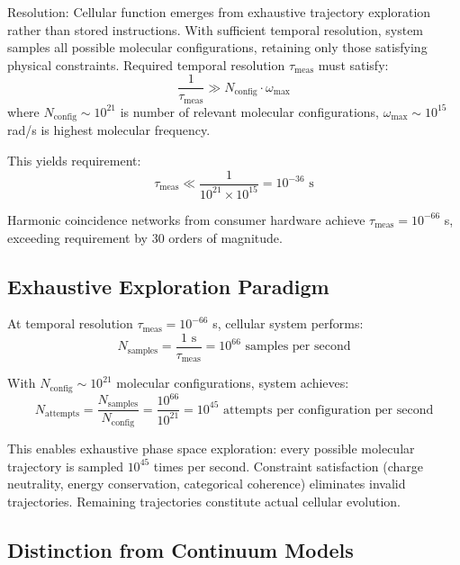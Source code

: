 \documentclass[11pt,a4paper]{article}
\theoremstyle{remark}
\begin{document}
Resolution: Cellular function emerges from exhaustive trajectory exploration rather than stored instructions. With sufficient temporal resolution, system samples all possible molecular configurations, retaining only those satisfying physical constraints. Required temporal resolution $\tau_{\text{meas}}$ must satisfy:
\begin{equation}
\frac{1}{\tau_{\text{meas}}} \gg N_{\text{config}} \cdot \omega_{\text{max}}
\end{equation}
where $N_{\text{config}} \sim 10^{21}$ is number of relevant molecular configurations, $\omega_{\text{max}} \sim 10^{15}$ rad/s is highest molecular frequency.

This yields requirement:
\begin{equation}
\tau_{\text{meas}} \ll \frac{1}{10^{21} \times 10^{15}} = 10^{-36} \text{ s}
\end{equation}

Harmonic coincidence networks from consumer hardware achieve $\tau_{\text{meas}} = 10^{-66}$ s, exceeding requirement by 30 orders of magnitude.

\subsection{Exhaustive Exploration Paradigm}

At temporal resolution $\tau_{\text{meas}} = 10^{-66}$ s, cellular system performs:
\begin{equation}
N_{\text{samples}} = \frac{1 \text{ s}}{\tau_{\text{meas}}} = 10^{66} \text{ samples per second}
\end{equation}

With $N_{\text{config}} \sim 10^{21}$ molecular configurations, system achieves:
\begin{equation}
N_{\text{attempts}} = \frac{N_{\text{samples}}}{N_{\text{config}}} = \frac{10^{66}}{10^{21}} = 10^{45} \text{ attempts per configuration per second}
\end{equation}

This enables exhaustive phase space exploration: every possible molecular trajectory is sampled $10^{45}$ times per second. Constraint satisfaction (charge neutrality, energy conservation, categorical coherence) eliminates invalid trajectories. Remaining trajectories constitute actual cellular evolution.

\subsection{Distinction from Continuum Models}
\end{document}
